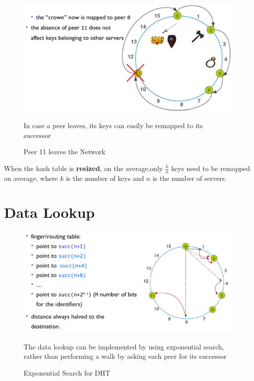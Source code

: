 \begin{figure}[htbp]
   \centering
   \includegraphics{images/p2p_peerleaves.png}
   \caption{Peer 11 leaves the Network}
   \label{fig:p2p_peerleaves}
   In case a peer leaves, its keys can easily be remapped to its successor
\end{figure}

When the hash table is \textbf{resized}, on the average,only $\frac{k}{n}$ keys need to be remapped on average, where $k$ is the number of keys and $n$ is the number of servers.
\newpage
\section{Data Lookup}
\begin{figure}[htbp]
   \centering
   \includegraphics{images/dht_exponentialsearch.png}
   \caption{Exponential Search for DHT}
   The data lookup can be implemented by using exponential search, rather than performing a walk by asking each peer for its successor
   \label{fig:dht_exponentialsearch}
\end{figure}

